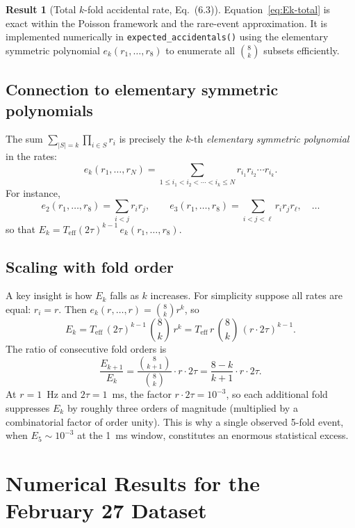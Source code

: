 \documentclass[12pt]{article}
\theoremstyle{definition}
\newtheorem{result}{Result}
\newcommand{\Teff}{T_{\!\text{eff}}}
\newcommand{\Eacc}[1]{E_{#1}}
\begin{document}
\begin{result}[Total $k$-fold accidental rate, Eq.\ (6.3)]
Equation~\eqref{eq:Ek-total} is exact within the Poisson framework and
the rare-event approximation.  It is implemented numerically in
\texttt{expected\_accidentals()} using the elementary symmetric
polynomial $e_k(r_1,\ldots,r_8)$ to enumerate all $\binom{8}{k}$ subsets
efficiently.
\end{result}

\subsection{Connection to elementary symmetric polynomials}

The sum $\displaystyle\sum_{|S|=k}\prod_{i\in S} r_i$ is precisely the
$k$-th \emph{elementary symmetric polynomial} in the rates:
\[
    e_k(r_1,\ldots,r_N) = \sum_{1\le i_1 < i_2 < \cdots < i_k \le N}
        r_{i_1} r_{i_2} \cdots r_{i_k}.
\]
For instance,
\[
    e_2(r_1,\ldots,r_8) = \sum_{i<j} r_i r_j, \qquad
    e_3(r_1,\ldots,r_8) = \sum_{i<j<\ell} r_i r_j r_\ell, \quad\ldots
\]
so that $\Eacc{k} = \Teff(2\tau)^{k-1}\,e_k(r_1,\ldots,r_8)$.

\subsection{Scaling with fold order}

A key insight is how $\Eacc{k}$ falls as $k$ increases.  For
simplicity suppose all rates are equal: $r_i = r$.  Then
$e_k(r,\ldots,r) = \binom{8}{k}r^k$, so
\[
    \Eacc{k} = \Teff\,(2\tau)^{k-1}\,\binom{8}{k}\,r^k
    = \Teff\,r\,\binom{8}{k}\,(r\cdot 2\tau)^{k-1}.
\]
The ratio of consecutive fold orders is
\begin{equation}
    \frac{\Eacc{k+1}}{\Eacc{k}}
    = \frac{\binom{8}{k+1}}{\binom{8}{k}}\cdot r\cdot 2\tau
    = \frac{8-k}{k+1}\cdot r\cdot 2\tau.
    \label{eq:fold-ratio}
\end{equation}
At $r = 1$~Hz and $2\tau = 1$~ms, the factor $r\cdot 2\tau = 10^{-3}$,
so each additional fold suppresses $\Eacc{k}$ by roughly three orders of
magnitude (multiplied by a combinatorial factor of order unity).  This
is why a single observed 5-fold event, when $\Eacc{5} \sim 10^{-3}$ at
the 1~ms window, constitutes an enormous statistical excess.

\section{Numerical Results for the February 27 Dataset}
\label{sec:numerical}
\end{document}
